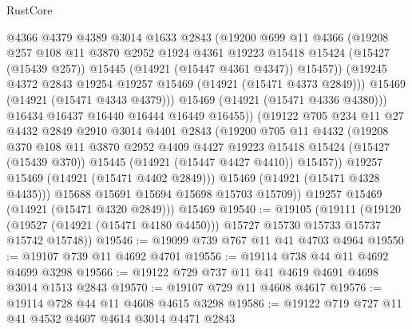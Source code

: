 \begin{lexlean}{RustCore}
\begin{coremodule}
                    @4366
                    @4379
                    @4389
                    @3014
                    @1633
                    @2843
                    (@19200
                      @699
                      @11
                      @4366
                      (@19208
                        @257
                        @108
                        @11
                        @3870
                        @2952
                        @1924
                        @4361
                        @19223
                        @15418
                        @15424
                        (@15427 (@15439 @257))
                        @15445
                        (@14921 (@15447 @4361 @4347))
                        @15457))
                    (@19245 @4372 @2843 @19254 @19257 @15469 (@14921 (@15471 @4373 @2849)))
                    @15469
                    (@14921 (@15471 @4343 @4379)))
                  @15469
                  (@14921 (@15471 @4336 @4380)))
                @16434
                @16437
                @16440
                @16444
                @16449
                @16455))
            (@19122
              @705
              @234
              @11
              @27
              @4432
              @2849
              @2910
              @3014
              @4401
              @2843
              (@19200
                @705
                @11
                @4432
                (@19208
                  @370
                  @108
                  @11
                  @3870
                  @2952
                  @4409
                  @4427
                  @19223
                  @15418
                  @15424
                  (@15427 (@15439 @370))
                  @15445
                  (@14921 (@15447 @4427 @4410))
                  @15457))
              @19257
              @15469
              (@14921 (@15471 @4402 @2849)))
            @15469
            (@14921 (@15471 @4328 @4435)))
          @15688
          @15691
          @15694
          @15698
          @15703
          @15709))
      @19257
      @15469
      (@14921 (@15471 @4320 @2849)))
    @15469
@19540 := @19105
    (@19111
      (@19120 (@19527 (@14921 (@15471 @4180 @4450))) @15727 @15730 @15733 @15737 @15742 @15748))
@19546 := @19099 @739 @767 @11 @41 @4703 @4964
@19550 := @19107 @739 @11 @4692 @4701
@19556 := @19114 @738 @44 @11 @4692 @4699 @3298
@19566 := @19122 @729 @737 @11 @41 @4619 @4691 @4698 @3014 @1513 @2843
@19570 := @19107 @729 @11 @4608 @4617
@19576 := @19114 @728 @44 @11 @4608 @4615 @3298
@19586 := @19122 @719 @727 @11 @41 @4532 @4607 @4614 @3014 @4471 @2843

\end{coremodule}
\end{lexlean}
